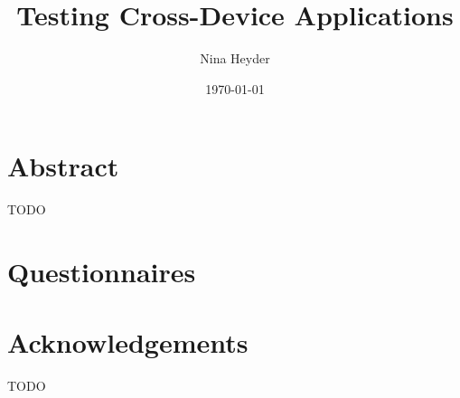 \documentclass[11pt,a4paper]{globis-book}
\title{Testing Cross-Device Applications}
\author{Nina Heyder}
\institute{Institute of Information Systems}
\date{\today}
\begin{document}
\frontmatter
\maketitlepage
\cleardoublepage
{}

\chapter*{Abstract}

TODO

\tableofcontents

\mainmatter










\appendix
\chapter{Questionnaires}
\label{sec:questionnaires}
\newpage

\newpage

\newpage

\newpage


\listoffigures
\listoftables

\chapter*{Acknowledgements}

TODO

\newpage
\thispagestyle{empty}



\end{document}
